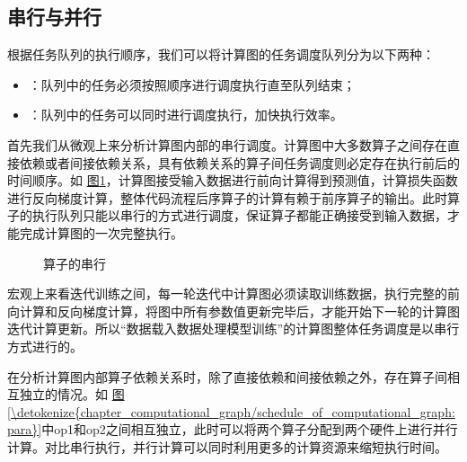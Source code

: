 \documentclass[letterpaper,10pt,english]{sphinxmanual}
\let\sphinxpxdimen\pdfpxdimen\else\newdimen\sphinxpxdimen
\begin{document}
\subsection{串行与并行}
\label{\detokenize{chapter_computational_graph/schedule_of_computational_graph:id3}}
\sphinxAtStartPar
根据任务队列的执行顺序，我们可以将计算图的任务调度队列分为以下两种：
\begin{itemize}
\item {} 
\sphinxAtStartPar
{}：队列中的任务必须按照顺序进行调度执行直至队列结束；

\item {} 
\sphinxAtStartPar
{}：队列中的任务可以同时进行调度执行，加快执行效率。

\end{itemize}

\sphinxAtStartPar
首先我们从微观上来分析计算图内部的串行调度。计算图中大多数算子之间存在直接依赖或者间接依赖关系，具有依赖关系的算子间任务调度则必定存在执行前后的时间顺序。如
\hyperref[\detokenize{chapter_computational_graph/schedule_of_computational_graph:order}]{图\ref{\detokenize{chapter_computational_graph/schedule_of_computational_graph:order}}}，计算图接受输入数据进行前向计算得到预测值，计算损失函数进行反向梯度计算，整体代码流程后序算子的计算有赖于前序算子的输出。此时算子的执行队列只能以串行的方式进行调度，保证算子都能正确接受到输入数据，才能完成计算图的一次完整执行。

\begin{figure}[H]
\centering
\capstart

\noindent\sphinxincludegraphics[width=800\sphinxpxdimen]{{order}.svg}
\caption{算子的串行}\label{\detokenize{chapter_computational_graph/schedule_of_computational_graph:id6}}\label{\detokenize{chapter_computational_graph/schedule_of_computational_graph:order}}\end{figure}

\sphinxAtStartPar
宏观上来看迭代训练之间，每一轮迭代中计算图必须读取训练数据，执行完整的前向计算和反向梯度计算，将图中所有参数值更新完毕后，才能开始下一轮的计算图迭代计算更新。所以“数据载入\sphinxhyphen{}数据处理\sphinxhyphen{}模型训练”的计算图整体任务调度是以串行方式进行的。

\sphinxAtStartPar
在分析计算图内部算子依赖关系时，除了直接依赖和间接依赖之外，存在算子间相互独立的情况。如
\hyperref[\detokenize{chapter_computational_graph/schedule_of_computational_graph:para}]{图\ref{\detokenize{chapter_computational_graph/schedule_of_computational_graph:para}}}中op1和op2之间相互独立，此时可以将两个算子分配到两个硬件上进行并行计算。对比串行执行，并行计算可以同时利用更多的计算资源来缩短执行时间。
\end{document}
